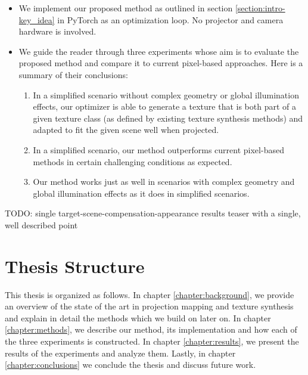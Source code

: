 \begin{itemize}
    \item We implement our proposed method as outlined in section \ref{section:intro-key_idea} in PyTorch as an optimization loop. No projector and camera hardware is involved.
    \item We guide the reader through three experiments whose aim is to evaluate the proposed method and compare it to current pixel-based approaches. Here is a summary of their conclusions:
    \begin{enumerate}
        \item In a simplified scenario without complex geometry or global illumination effects, our optimizer is able to generate a texture that is both part of a given texture class (as defined by existing texture synthesis methods) and adapted to fit the given scene well when projected.
        \item In a simplified scenario, our method outperforms current pixel-based methods in certain challenging conditions as expected.
        \item Our method works just as well in scenarios with complex geometry and global illumination effects as it does in simplified scenarios.
    \end{enumerate}
\end{itemize}

{\color{red} TODO: single target-scene-compensation-appearance results teaser with a single, well described point}

\section{Thesis Structure}
\label{section:intro-thesis_structure}

This thesis is organized as follows. In chapter \ref{chapter:background}, we provide an overview of the state of the art in projection mapping and texture synthesis and explain in detail the methods which we build on later on. In chapter \ref{chapter:methods}, we describe our method, its implementation and how each of the three experiments is constructed. In chapter \ref{chapter:results}, we present the results of the experiments and analyze them. Lastly, in chapter \ref{chapter:conclusions} we conclude the thesis and discuss future work.
